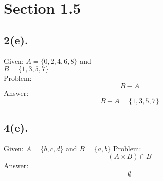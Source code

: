 \documentclass[12pt]{article}
\begin{document}
\begin{minipage}[t]{0.40\textwidth}
\section*{Section 1.5}
\subsection*{2(e).}
Given: $ A=\{0,2,4,6,8\} $ and\\ $ B=\{1,3,5,7\} $ \\
Problem: $$ B-A $$
Answer: \[ B-A = \{1,3,5,7\}\]

\subsection*{4(e).}
Given: $ A=\{b,c,d\} $ and $ B=\{a,b\} $
Problem: \[ (A\times B) \cap B\]
Answer: \[ \emptyset\]


\end{minipage}
\hfill\vline\hfill
\begin{minipage}[t]{0.45\textwidth}
\section*{}

\end{minipage}
\end{document}

